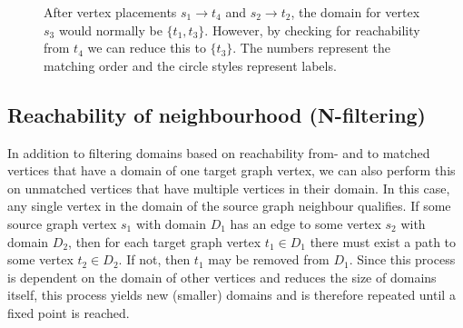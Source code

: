 \begin{figure}
\centering
\parbox{1.2in}{

}
\qquad\qquad
\begin{minipage}{1.2in}%

\end{minipage}
\caption{After vertex placements $s_1 \to t_4$ and $s_2 \to t_2$, the domain for vertex $s_3$ would normally be $\{t_1, t_3\}$. However, by checking for reachability from $t_4$ we can reduce this to $\{t_3\}$. The numbers represent the matching order and the circle styles represent labels.}
\label{fig:reachability-filtered}
\end{figure}
\subsection{Reachability of neighbourhood \hspace{12pt}(N-filtering)}
In addition to filtering domains based on reachability from- and to matched vertices that have a domain of one target graph vertex, we can also perform this on unmatched vertices that have multiple vertices in their domain. In this case, any single vertex in the domain of the source graph neighbour qualifies. If some source graph vertex $s_1$ with domain $D_1$ has an edge to some vertex $s_2$ with domain $D_2$, then for each target graph vertex $t_1 \in D_1$ there must exist a path to some vertex $t_2 \in D_2$. If not, then $t_1$ may be removed from $D_1$. Since this process is dependent on the domain of other vertices and reduces the size of domains itself, this process yields new (smaller) domains and is therefore repeated until a fixed point is reached.

